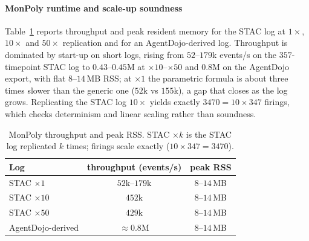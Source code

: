 \documentclass[sigconf]{acmart}
\begin{document}
\paragraph{MonPoly runtime and scale-up soundness} Table~\ref{tab:runtime} reports
throughput and peak resident memory for the STAC log at $1\times$, $10\times$ and
$50\times$ replication and for an AgentDojo-derived log. Throughput is dominated by
start-up on short logs, rising from $52$--$179$k events/s on the $357$-timepoint STAC
log to $0.43$--$0.45$M at $\times10$--$\times50$ and $0.8$M on the AgentDojo export,
with flat $8$--$14$\,MB RSS; at $\times1$ the parametric formula is about three times
slower than the generic one ($52$k vs $155$k), a gap that closes as the log grows.
Replicating the STAC log $10\times$ yields exactly $3470=10\times347$ firings, which
checks determinism and linear scaling rather than soundness.

\begin{table}[htbp]
\centering
\caption{MonPoly throughput and peak RSS. STAC $\times k$ is the STAC log replicated
$k$ times; firings scale exactly ($10\times347=3470$).}
\label{tab:runtime}
\renewcommand{\arraystretch}{1.0}
\setlength{\tabcolsep}{6pt}
\small
\begin{tabular}{lcc}
\toprule
Log & throughput (events/s) & peak RSS \\
\midrule
STAC $\times1$          & $52$k--$179$k & $8$--$14$\,MB \\
STAC $\times10$         & $452$k        & $8$--$14$\,MB \\
STAC $\times50$         & $429$k        & $8$--$14$\,MB \\
AgentDojo-derived       & $\approx0.8$M & $8$--$14$\,MB \\
\bottomrule
\end{tabular}
\end{table}
\end{document}
